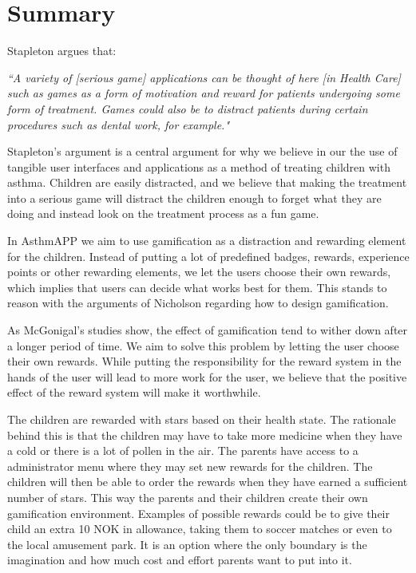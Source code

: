 \section{Summary}
\label{sec:gamificationinapp}

Stapleton argues that:

\textit{``A variety of [serious game] applications can be thought of here [in Health Care] such as games as a form of motivation and reward for patients undergoing some form of treatment. Games could also be to distract patients during certain procedures such as dental work, for example."}\cite{stapleton2004serious}


Stapleton's argument is a central argument for why we believe in our the use of tangible user interfaces and applications as a method of treating children with asthma. Children are easily distracted, and we believe that making the treatment into a serious game will distract the children enough to forget what they are doing and instead look on the treatment process as a fun game.


In AsthmAPP we aim to use gamification as a distraction and rewarding element for the children. Instead of putting a lot of predefined badges, rewards, experience points or other rewarding elements, we let the users choose their own rewards, which implies that users can decide what works best for them. This stands to reason with the arguments of Nicholson\cite{nicholson2012user} regarding how to design gamification.

As McGonigal's studies show, the effect of gamification tend to wither down after a longer period of time\cite{jane2011reality}. We aim to solve this problem by letting the user choose their own rewards. While putting the responsibility for the reward system in the hands of the user will lead to more work for the user, we believe that the positive effect of the reward system will make it worthwhile. 
 

The children are rewarded with stars based on their health state. The rationale behind this is that the children may have to take more medicine when they have a cold or there is a lot of pollen in the air. The parents have access to a administrator menu where they may set new rewards for the children. The children will then be able to order the rewards when they have earned a sufficient number of stars. This way the parents and their children create their own gamification environment. Examples of possible rewards could be to give their child an extra 10 NOK in allowance, taking them to soccer matches or even to the local amusement park. It is an option where the only boundary is the imagination and how much cost and effort parents want to put into it.    


